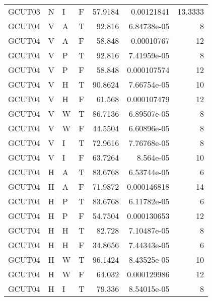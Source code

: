 \begin{longtable}{llllrrr}
    GCUT03   & N         & I         & F          & 57.9184    & 0.00121841  & 13.3333  \\
    GCUT04   & V         & A         & T          & 92.816     & 6.84738e-05 & 8        \\
    GCUT04   & V         & A         & F          & 58.848     & 0.00010767  & 12       \\
    GCUT04   & V         & P         & T          & 92.816     & 7.41959e-05 & 8        \\
    GCUT04   & V         & P         & F          & 58.848     & 0.000107574 & 12       \\
    GCUT04   & V         & H         & T          & 90.8624    & 7.66754e-05 & 10       \\
    GCUT04   & V         & H         & F          & 61.568     & 0.000107479 & 12       \\
    GCUT04   & V         & W         & T          & 86.7136    & 6.89507e-05 & 8        \\
    GCUT04   & V         & W         & F          & 44.5504    & 6.60896e-05 & 8        \\
    GCUT04   & V         & I         & T          & 72.9616    & 7.76768e-05 & 8        \\
    GCUT04   & V         & I         & F          & 63.7264    & 8.564e-05   & 10       \\
    GCUT04   & H         & A         & T          & 83.6768    & 6.53744e-05 & 6        \\
    GCUT04   & H         & A         & F          & 71.9872    & 0.000146818 & 14       \\
    GCUT04   & H         & P         & T          & 83.6768    & 6.11782e-05 & 6        \\
    GCUT04   & H         & P         & F          & 54.7504    & 0.000130653 & 12       \\
    GCUT04   & H         & H         & T          & 82.728     & 7.10487e-05 & 8        \\
    GCUT04   & H         & H         & F          & 34.8656    & 7.44343e-05 & 6        \\
    GCUT04   & H         & W         & T          & 96.1424    & 8.43525e-05 & 10       \\
    GCUT04   & H         & W         & F          & 64.032     & 0.000129986 & 12       \\
    GCUT04   & H         & I         & T          & 79.336     & 8.54015e-05 & 8        \\

\end{longtable}
